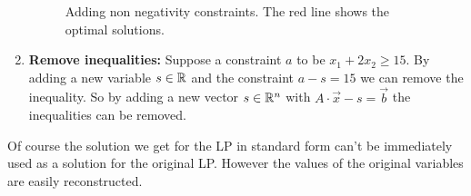 \begin{pr}
\begin{enumerate}
\begin{figure}[hbt]
\begin{minipage}[hbt]{0.4\linewidth}
\end{minipage}
\caption{Adding non negativity constraints. The red line shows the optimal solutions.}
\label{Fig:1dTo2d}
\end{figure}

\item {\bfseries Remove inequalities:} Suppose a constraint $a$ to be $x_1+2x_2 \geq 15$. By adding a new variable $s\in \mathbb{R}$ and the constraint $a-s=15$ we can remove the inequality. So by adding a new vector $s\in \mathbb{R}^n$ with $A \cdot \vec x - s = \vec b$ the inequalities can be removed.
\end{enumerate}



Of course the solution we get for the LP in standard form can't be immediately used as a solution for the original LP. However the values of the original variables are easily reconstructed.

\end{pr}